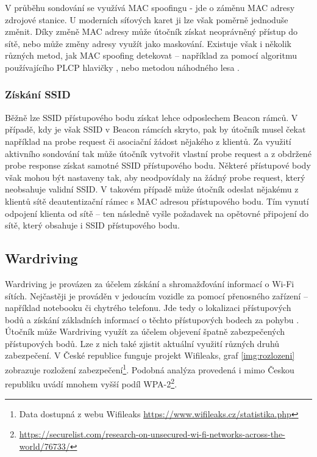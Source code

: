 V průběhu sondování se využívá MAC spoofingu - jde o záměnu MAC adresy zdrojové stanice. U moderních síťových karet ji lze však poměrně jednoduše změnit. Díky změně MAC adresy může útočník získat neoprávněný přístup do sítě, nebo může změny adresy využít jako maskování. Existuje však i několik různých metod, jak MAC spoofing detekovat -- například za pomocí algoritmu používajícího PLCP hlavičky \cite{plcp}, nebo metodou náhodného lesa \cite{alotaibi2016new}. 

\subsubsection*{Získání SSID}
Běžně lze SSID přístupového bodu získat lehce odposlechem Beacon rámců. V případě, kdy je však SSID v Beacon rámcích skryto, pak by útočník musel čekat například na probe request či asociační žádost nějakého z klientů. Za využití aktivního sondování tak může útočník vytvořit vlastní probe request a z obdržené probe response získat samotné SSID přístupového bodu. Některé přístupové body však mohou být nastaveny tak, aby neodpovídaly na žádný probe request, který neobsahuje validní SSID. V takovém případě může útočník odeslat nějakému z klientů sítě deautentizační rámec s MAC adresou přístupového bodu. Tím vynutí odpojení klienta od sítě -- ten následně vyšle požadavek na opětovné připojení do sítě, který obsahuje i SSID přístupového bodu.


\subsection{Wardriving}
Wardriving je provázen za účelem získání a shromažďování informací o Wi-Fi sítích. Nejčastěji je prováděn v jedoucím vozidle za pomocí přenosného zařízení -- například notebooku či chytrého telefonu. Jde tedy o lokalizaci přístupových bodů a získání základních informací o těchto přístupových bodech za pohybu \cite{wardriving}. Útočník může Wardriving využít za účelem objevení špatně zabezpečených přístupových bodů. Lze z nich také zjistit aktuální využití různých druhů zabezpečení. V České republice funguje projekt Wifileaks, graf \ref{img:rozlozeni} zobrazuje rozložení zabezpečení\footnote{Data dostupná z webu Wifileaks \url{https://www.wifileaks.cz/statistika.php}}. Podobná analýza provedená i mimo Českou republiku uvádí mnohem vyšší podíl WPA-2\footnote{\url{https://securelist.com/research-on-unsecured-wi-fi-networks-across-the-world/76733/}}.

